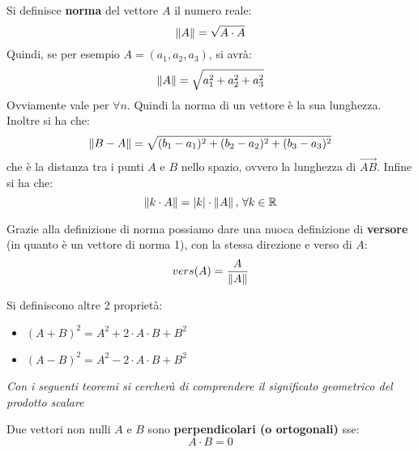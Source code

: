 \documentclass[a4paper,12pt, oneside]{book}
\begin{document}
\begin{definizione}
	Si definisce \textbf{norma} del vettore $A$ il numero reale:
	$$\left\lVert {A} \right\rVert=\sqrt{A\cdot A}$$
	Quindi, se per esempio $A=(a_1,a_2,a_3)$, si avrà:
	$$\left\lVert {A} \right\rVert=\sqrt{a_1^2+a_2^2+a_3^2}$$
	Ovviamente vale per $\forall n$.
	Quindi la norma di un vettore è la sua lunghezza.\\
	Inoltre si ha che:
	$$\left\lVert {B-A} \right\rVert=\sqrt{(b_1-a_1)^2+(b_2-a_2)^2+(b_3-a_3)^2}$$
	che è la distanza tra i punti $A$ e $B$ nello spazio, ovvero la lunghezza di $\vec{AB}$. Infine si ha che:
	$$\left\lVert {k\cdot A} \right\rVert=|k|\cdot \left\lVert {A} \right\rVert,\, \forall k \in \mathbb{R}$$
\end{definizione}
\newpage
\begin{nota}
	Grazie alla definizione di norma possiamo dare una nuoca definizione di \textbf{versore} (in quanto è un vettore di norma 1), con la stessa direzione e verso di $A$:
	$$vers(A)=\frac{A}{\left\lVert {A} \right\rVert}$$
\end{nota}
Si definiscono altre 2 proprietà:
\begin{itemize}
	\item $(A+B)^2=A^2+2\cdot A\cdot B+B^2$
	\item $(A-B)^2=A^2-2\cdot A\cdot B+B^2$
\end{itemize}
\textit{Con i seguenti teoremi si cercherà di comprendere il significato geometrico del prodotto scalare}
\begin{teorema}
	Due vettori non nulli $A$ e $B$ sono \textbf{perpendicolari (o ortogonali)} sse:
	$$A\cdot B=0$$
\end{teorema}
\end{document}
